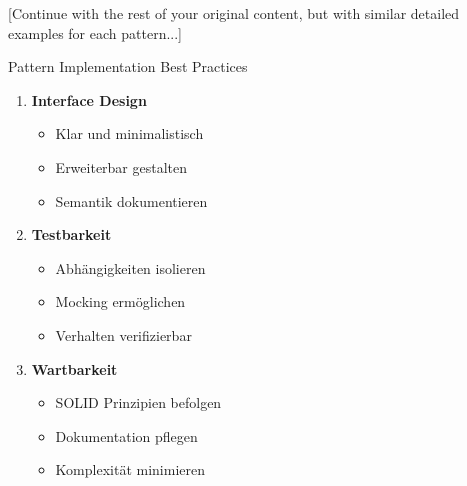 [Continue with the rest of your original content, but with similar detailed examples for each pattern...]

\begin{KR}{Pattern Implementation Best Practices}
\begin{enumerate}
    \item \textbf{Interface Design}
    \begin{itemize}
        \item Klar und minimalistisch
        \item Erweiterbar gestalten
        \item Semantik dokumentieren
    \end{itemize}
    
    \item \textbf{Testbarkeit}
    \begin{itemize}
        \item Abhängigkeiten isolieren
        \item Mocking ermöglichen
        \item Verhalten verifizierbar
    \end{itemize}
    
    \item \textbf{Wartbarkeit}
    \begin{itemize}
        \item SOLID Prinzipien befolgen
        \item Dokumentation pflegen
        \item Komplexität minimieren
    \end{itemize}
\end{enumerate}
\end{KR}